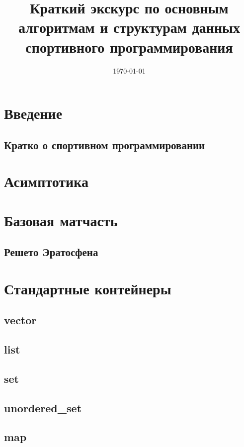 \documentclass[a4paper,8pt]{article}
\begin{document}
\title{Краткий экскурс по основным алгоритмам и структурам данных спортивного программирования}
\date{\today}
\maketitle
\newpage
\tableofcontents
\newpage

\section{Введение}
    \subsection{Кратко о спортивном программировании}
\section{Асимптотика} 
\section{Базовая матчасть}
    
    
    
    
    \subsection{Решето Эратосфена}
\section{Стандартные контейнеры}
    \subsection{vector}
    \subsection{list}
    \subsection{set}
    \subsection{unordered\_set}
    \subsection{map}
\end{document}
